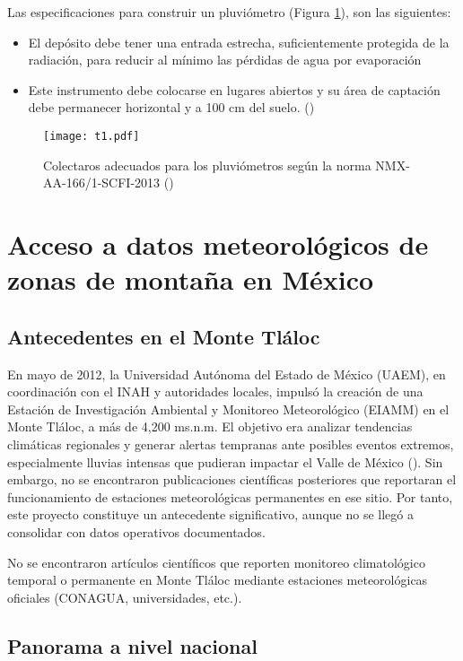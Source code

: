 Las especificaciones para construir un pluviómetro (Figura \ref{t1}), son las siguientes:
\begin{itemize}
    \item El depósito debe tener una entrada estrecha, suficientemente protegida de la radiación, para reducir al mínimo las pérdidas de agua por evaporación
    \item Este instrumento debe colocarse en lugares abiertos y su área de captación debe permanecer horizontal y a 100 cm del suelo. (\cite{se2013})
\end{itemize}

\begin{figure}[h!]
\centering
  \texttt{[image: t1.pdf]}
  \caption{Colectaros adecuados para los pluviómetros según la norma NMX-AA-166/1-SCFI-2013 (\cite{se2013})}
  \label{t1}
\end{figure}


\newpage


\section{Acceso a datos meteorológicos de zonas de montaña en México}

\subsection{Antecedentes en el Monte Tláloc}

En mayo de 2012, la Universidad Autónoma del Estado de México (UAEM), en coordinación con el INAH y autoridades locales, impulsó la creación de una Estación de Investigación Ambiental y Monitoreo Meteorológico (EIAMM) en el Monte Tláloc, a más de 4,200 ms.n.m. El objetivo era analizar tendencias climáticas regionales y generar alertas tempranas ante posibles eventos extremos, especialmente lluvias intensas que pudieran impactar el Valle de México  (\cite{davila2012}). Sin embargo, no se encontraron publicaciones científicas posteriores que reportaran el funcionamiento de estaciones meteorológicas permanentes en ese sitio. Por tanto, este proyecto constituye un antecedente significativo, aunque no se llegó a consolidar con datos operativos documentados.

No se encontraron artículos científicos que reporten monitoreo climatológico temporal o permanente en Monte Tláloc mediante estaciones meteorológicas oficiales (CONAGUA, universidades, etc.).


\subsection{Panorama a nivel nacional}

